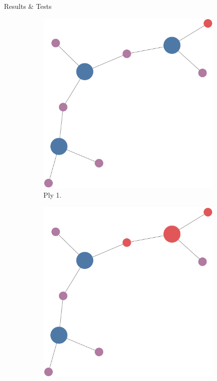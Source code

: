 \documentclass[final]{beamer} %
\begin{document}
\begin{frame}
\begin{columns}
\begin{column}{.33\textwidth}
{\begin{block}{Results \& Tests}
					\begin{figure}[!htb]
						\centering
						\begin{subfigure}[!htb]{0.32\columnwidth}
							\centering
							\includegraphics[width=\columnwidth]{figures/knn_simple_backward_think_0.pdf}
							\caption{Ply 1.}
						\end{subfigure}
						\begin{subfigure}[!htb]{0.32\columnwidth}
							\centering
							\includegraphics[width=\columnwidth]{figures/knn_simple_backward_think_1.pdf}

\end{subfigure}
\end{figure}
\end{block}}
\end{column}
\end{columns}
\end{frame}
\end{document}
